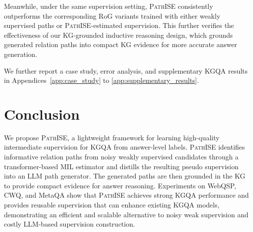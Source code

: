 \documentclass{article}
\newcommand{\framework}{\textsc{PathISE}\xspace}
\begin{document}
Meanwhile, under the same supervision setting, \framework{} consistently outperforms the corresponding RoG variants trained with either weakly supervised paths or \framework{}-estimated supervision.
This further verifies the effectiveness of our KG-grounded inductive reasoning design, which grounds generated relation paths into compact KG evidence for more accurate answer generation.

We further report a case study, error analysis, and supplementary KGQA results in Appendices~\ref{app:case_study} to \ref{app:supplementary_results}.

\section{Conclusion}

We propose \framework{}, a lightweight framework for learning high-quality intermediate supervision for KGQA from answer-level labels. \framework{} identifies informative relation paths from noisy weakly supervised candidates through a transformer-based MIL estimator and distills the resulting pseudo supervision into an LLM path generator. The generated paths are then grounded in the KG to provide compact evidence for answer reasoning. Experiments on WebQSP, CWQ, and MetaQA show that \framework{} achieves strong KGQA performance and provides reusable supervision that can enhance existing KGQA models, demonstrating an efficient and scalable alternative to noisy weak supervision and costly LLM-based supervision construction. 




{
\small
 

}
\end{document}
